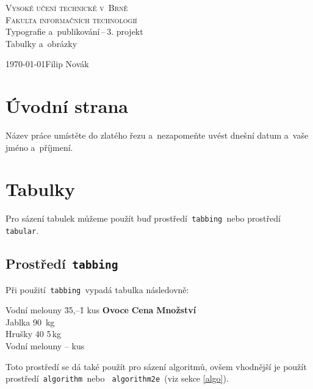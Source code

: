 \documentclass[a4paper, 11pt]{article}
\begin{document}
\begin{titlepage}
    \begin{center}
        \textsc{\Huge{Vysoké učení technické v~Brně\\[0.4em]}
        \huge{Fakulta informačních technologií}}\\        
        \LARGE{Typografie a~publikování\,--\,3. projekt}\\
        \Huge{Tabulky a~obrázky}\\
    \end{center}
    \Large{\today\hfill Filip Novák}
\end{titlepage}

\section{Úvodní strana}
Název práce umístěte do zlatého řezu a~nezapomeňte uvést dnešní datum a~vaše jméno a~příjmení.

\section{Tabulky}\label{tabulky}
Pro sázení tabulek můžeme použít buď prostředí\texttt{ tabbing }nebo prostředí\texttt{ tabular}.
\subsection{Prostředí\texttt{ tabbing }}
Při použití\texttt{ tabbing }vypadá tabulka následovně:
\begin{tabbing}
    Vodní melouny \quad\=35{,}--\qquad \=1 kus \kill
    \textbf{Ovoce} \> \textbf{Cena} \> \textbf{Množství}\\
    Jablka 90 \,kg\\
    Hrušky 40 5\,kg\\
    Vodní melouny --  kus\\
\end{tabbing}

\noindent Toto prostředí se dá také použít pro sázení algoritmů, ovšem vhodnější je použít prostředí\texttt{ algorithm }nebo
\texttt{ algorithm2e }(viz sekce \ref{algo}).
\end{document}
